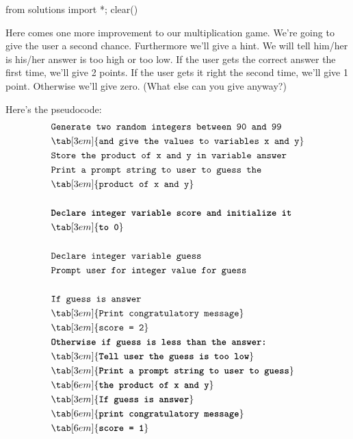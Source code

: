\begin{python0}
from solutions import *; clear()
\end{python0}

Here comes one more improvement to our multiplication game. We're going to give the user a second chance. Furthermore we'll give a hint. We will tell him/her is his/her answer is too high or too low. If the user gets the correct answer the first time, we'll give 2 points. If the user gets it right the second time, we'll give 1 point. Otherwise we'll give zero. (What else can you give anyway?)

Here's the pseudocode:
\begin{align*}
&\texttt{Generate two random integers between 90 and 99}\\
&\tab[3em]{\texttt{and give the values to variables x and y}}\\
&\texttt{Store the product of x and y in variable answer}\\
&\texttt{Print a prompt string to user to guess the}\\
&\tab[3em]{\texttt{product of x and y}}\\\\
&\texttt{\textbf{Declare integer variable score and initialize it}}\\
&\tab[3em]{\textbf{\texttt{to 0}}}\\\\
&\texttt{Declare integer variable guess}\\
&\texttt{Prompt user for integer value for guess}\\\\
&\texttt{If guess is answer}\\
&\tab[3em]{\texttt{Print congratulatory message}}\\
&\tab[3em]{\texttt{score = 2}}\\
&\textbf{\texttt{Otherwise if guess is less than the answer:}}\\
&\tab[3em]{\textbf{\texttt{Tell user the guess is too low}}}\\
&\tab[3em]{\textbf{\texttt{Print a prompt string to user to guess}}}\\
&\tab[6em]{\textbf{\texttt{the product of x and y}}}\\
&\tab[3em]{\textbf{\texttt{If guess is answer}}}\\
&\tab[6em]{\textbf{\texttt{print congratulatory message}}}\\
&\tab[6em]{\textbf{\texttt{score = 1}}}\\

\end{align*}
